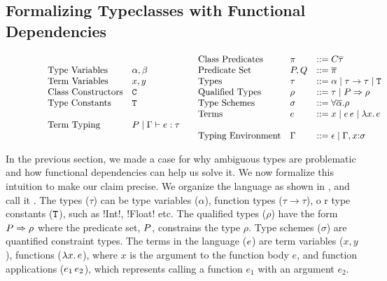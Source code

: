 \documentclass[format=acmsmall,manuscript,screen,nonacm,margin=1in,11pt]{acmart}
\begin{document}
\subsection{Formalizing Typeclasses with Functional Dependencies}\label{subsec:tc-formal}
\begin{figure}[ht]
    \small
  \[
  \begin{array}{l l l}
    &\text{Type Variables}     &\alpha, \beta\\
    &\text{Term Variables}     &x, y\\
    &\text{Class Constructors} &\texttt{C}\\
    &\text{Type Constants}  &\texttt{T}\\    
    \\
    &\text{Term Typing}        &P \mid \Gamma \vdash e : \tau\\
  \end{array}
  \begin{array}{l l l l}
    &\text{Class Predicates}      &\pi               &\mathrel{{:}{:}{=}} C\overline{\tau}\\
    &\text{Predicate Set}         &P,Q &\mathrel{{:}{:}{=}} \overline{\pi}\\
    &\text{Types}                 &\tau              &\mathrel{{:}{:}{=}} \alpha \mathrel{\mid} \tau\to\tau \mathrel{\mid} \texttt{T}\\
    &\text{Qualified Types}       &\rho              &\mathrel{{:}{:}{=}} \tau \mathrel{\mid} P\Rightarrow\rho\\
    &\text{Type Schemes}          &\sigma            &\mathrel{{:}{:}{=}} \forall{\overline{\alpha}}.\rho\\
    &\text{Terms}                 &e               &\mathrel{{:}{:}{=}} x \mathrel{\mid} e\,e \mathrel{\mid} \lambda x.\, e\\
    \\
    &\text{Typing Environment} &\Gamma &\mathrel{{:}{:}{=}} \epsilon \mathrel{\mid} \Gamma,x{:}\sigma
  \end{array}
  \]
  \caption[\TCFD]{\TCFD}
  \label{fig:tcfd-syntax}
\end{figure}
In the previous section, we made a case for why ambiguous types are problematic and how
functional dependencies can help us solve it. We now formalize this intuition to make our claim precise.
We organize the language as shown in , and call it \TCFD.
The types ($\tau$) can be type variables ($\alpha$), function types ($\tau\to\tau$), o
r type constants ($\texttt{T}$), such as !Int!, !Float! etc. The qualified types ($\rho$) have the form $P\Rightarrow\rho$
where the predicate set, $P$, constrains the type $\rho$.
Type schemes ($\sigma$) are quantified constraint types. The terms in the language ($e$) are term variables ($x, y$),
functions ($\lambda x.\, e$), where $x$ is the argument to the function body $e$,
and function applications ($e_1\, e_2$), which represents calling a function $e_1$ with an argument $e_2$.
\end{document}
